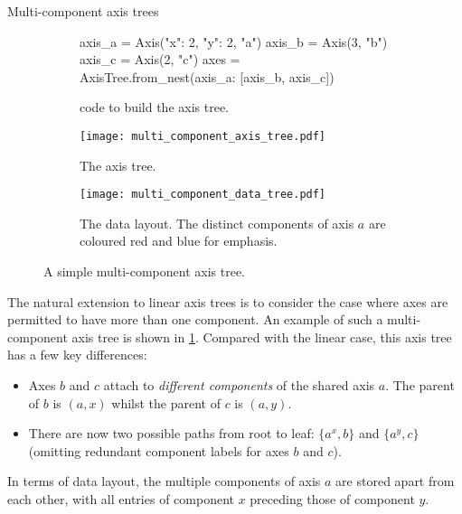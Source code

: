 \documentclass[thesis]{subfiles}
\begin{document}
\begin{example}{Multi-component axis trees}

\begin{figure}
  \begin{subfigure}{.9\textwidth}
    \begin{pyalg2}
      axis_a = Axis({"x": 2, "y": 2}, "a")
      axis_b = Axis(3, "b")
      axis_c = Axis(2, "c")
      axes = AxisTree.from_nest({axis_a: [axis_b, axis_c]})
    \end{pyalg2}
    \caption{ code to build the axis tree.}
  \end{subfigure}

  \vspace{1em}

  \begin{subfigure}{.4\textwidth}
    \centering
    \texttt{[image: multi\_component\_axis\_tree.pdf]}
    \caption{The axis tree.}
  \end{subfigure}
  \begin{subfigure}{.4\textwidth}
    \centering
    \texttt{[image: multi\_component\_data\_tree.pdf]}
    \caption{
      The data layout.
      The distinct components of axis $a$ are coloured red and blue for emphasis.
    }
  \end{subfigure}
  \caption{
    A simple multi-component axis tree.
  }
  \label{fig:multi_component_axis_tree_intro}
\end{figure}

The natural extension to linear axis trees is to consider the case where axes are permitted to have more than one component.
An example of such a multi-component axis tree is shown in \cref{fig:multi_component_axis_tree_intro}.
Compared with the linear case, this axis tree has a few key differences:

\begin{itemize}
  \item
    Axes $b$ and $c$ attach to \emph{different components} of the shared axis $a$.
    The parent of $b$ is $(a, x)$ whilst the parent of $c$ is $(a, y)$.

  \item
    There are now two possible paths from root to leaf: $\{ a^x, b \}$ and $\{ a^y, c \}$ (omitting redundant component labels for axes $b$ and $c$).
\end{itemize}

In terms of data layout, the multiple components of axis $a$ are stored apart from each other, with all entries of component $x$ preceding those of component $y$.

\end{example}
\end{document}
